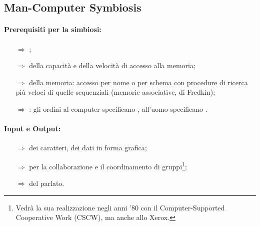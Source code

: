 
\subsection{Man-Computer Symbiosis}

\paragraph{Prerequisiti per la simbiosi:}

\begin{itemize}
    \item [$\Rightarrow$] ;
    \item [$\Rightarrow$]  della capacità e della velocità di accesso alla memoria;
    \item [$\Rightarrow$]  della memoria: accesso per nome o per schema con procedure di
    ricerca più veloci di quelle sequenziali (memorie associative,  di Fredkin);
    \item [$\Rightarrow$] : gli ordini al computer specificano , all'uomo specificano .
\end{itemize}

\paragraph{Input e Output:}

\begin{itemize}
    \item [$\Rightarrow$]  dei caratteri,  dei dati in forma grafica;
    \item [$\Rightarrow$]  per la collaborazione e il coordinamento di gruppi\footnote{
        Vedrà la sua realizzazione negli anni '80 con il Computer-Supported Cooperative Work (CSCW), ma anche allo Xerox.
    };
    \item [$\Rightarrow$]  del parlato.
\end{itemize}


